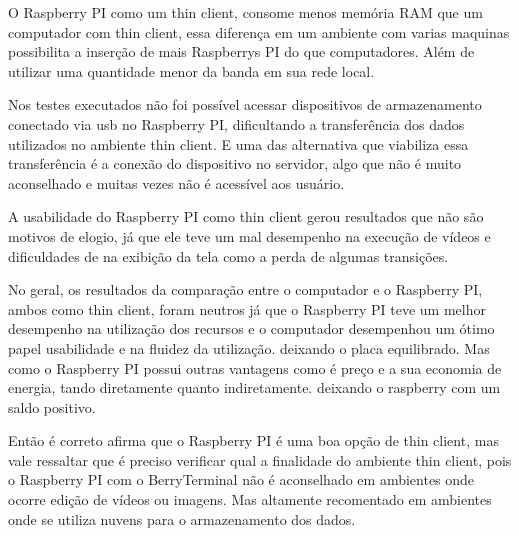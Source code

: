 \documentclass[
	12pt,				%
	openright,			%
	twoside,			%
	a4paper,			%
	chapter=TITLE,		%
	english,			%
	brazil				%
	]{abntex2}
\begin{document}
O Raspberry PI como um thin client, consome menos memória RAM que um computador com thin client, essa diferença em um ambiente com varias maquinas possibilita a inserção de mais Raspberrys PI do que computadores. Além de utilizar uma quantidade menor da banda em sua rede local.

Nos testes executados não foi possível acessar dispositivos de armazenamento conectado via usb no Raspberry PI, dificultando a transferência dos dados utilizados no ambiente thin client. E  uma das alternativa que viabiliza essa transferência é a conexão do dispositivo no servidor, algo que não é muito aconselhado e muitas vezes não é acessível aos usuário.

A usabilidade do Raspberry PI como thin client gerou resultados que não são motivos de elogio, já que ele teve um mal desempenho na execução de vídeos e dificuldades de na exibição da tela como a perda de algumas transições.

No geral, os resultados da comparação entre o computador e o Raspberry PI, ambos como thin client, foram neutros já que o Raspberry PI teve um melhor desempenho na utilização dos recursos e o computador desempenhou um ótimo papel usabilidade e na fluidez da utilização. deixando o placa equilibrado. Mas como o Raspberry PI possui outras vantagens como é preço e a sua economia de energia, tando diretamente quanto indiretamente. deixando o raspberry com um saldo positivo.

Então é correto afirma que o Raspberry PI é uma boa opção de thin client, mas vale ressaltar que é preciso verificar qual a finalidade do ambiente thin client, pois o Raspberry PI com o BerryTerminal não é aconselhado em ambientes onde ocorre edição de vídeos ou imagens. Mas altamente recomentado em ambientes onde se utiliza nuvens para o armazenamento dos dados.






\postextual

\end{document}
